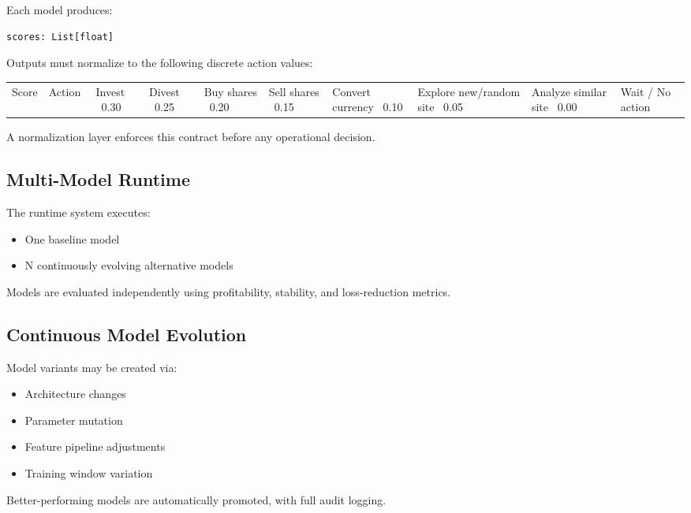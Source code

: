 \documentclass[11pt]{article}
\begin{document}
Each model produces:

\begin{verbatim}
scores: List[float]
\end{verbatim}

Outputs must normalize to the following discrete action values:

\begin{center}
\begin{tabular}{ll}
\toprule
Score & Action \
 & Invest \
0.30 & Divest \
0.25 & Buy shares \
0.20 & Sell shares \
0.15 & Convert currency \
0.10 & Explore new/random site \
0.05 & Analyze similar site \
0.00 & Wait / No action \
\bottomrule
\end{tabular}
\end{center}

A normalization layer enforces this contract before any operational decision.

\subsection*{Multi-Model Runtime}

The runtime system executes:

\begin{itemize}
\item One baseline model
\item N continuously evolving alternative models
\end{itemize}

Models are evaluated independently using profitability, stability, and loss-reduction metrics.

\subsection*{Continuous Model Evolution}

Model variants may be created via:

\begin{itemize}
\item Architecture changes
\item Parameter mutation
\item Feature pipeline adjustments
\item Training window variation
\end{itemize}

Better-performing models are automatically promoted, with full audit logging.
\end{document}
